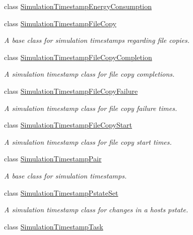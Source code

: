 \begin{DoxyCompactItemize}
class \hyperlink{classwrench_1_1_simulation_timestamp_energy_consumption}{Simulation\+Timestamp\+Energy\+Consumption}
\item 
class \hyperlink{classwrench_1_1_simulation_timestamp_file_copy}{Simulation\+Timestamp\+File\+Copy}
\begin{DoxyCompactList}\small\item\em A base class for simulation timestamps regarding file copies. \end{DoxyCompactList}\item 
class \hyperlink{classwrench_1_1_simulation_timestamp_file_copy_completion}{Simulation\+Timestamp\+File\+Copy\+Completion}
\begin{DoxyCompactList}\small\item\em A simulation timestamp class for file copy completions. \end{DoxyCompactList}\item 
class \hyperlink{classwrench_1_1_simulation_timestamp_file_copy_failure}{Simulation\+Timestamp\+File\+Copy\+Failure}
\begin{DoxyCompactList}\small\item\em A simulation timestamp class for file copy failure times. \end{DoxyCompactList}\item 
class \hyperlink{classwrench_1_1_simulation_timestamp_file_copy_start}{Simulation\+Timestamp\+File\+Copy\+Start}
\begin{DoxyCompactList}\small\item\em A simulation timestamp class for file copy start times. \end{DoxyCompactList}\item 
class \hyperlink{classwrench_1_1_simulation_timestamp_pair}{Simulation\+Timestamp\+Pair}
\begin{DoxyCompactList}\small\item\em A base class for simulation timestamps. \end{DoxyCompactList}\item 
class \hyperlink{classwrench_1_1_simulation_timestamp_pstate_set}{Simulation\+Timestamp\+Pstate\+Set}
\begin{DoxyCompactList}\small\item\em A simulation timestamp class for changes in a host\textquotesingle{}s pstate. \end{DoxyCompactList}\item 
class \hyperlink{classwrench_1_1_simulation_timestamp_task}{Simulation\+Timestamp\+Task}

\end{DoxyCompactItemize}
